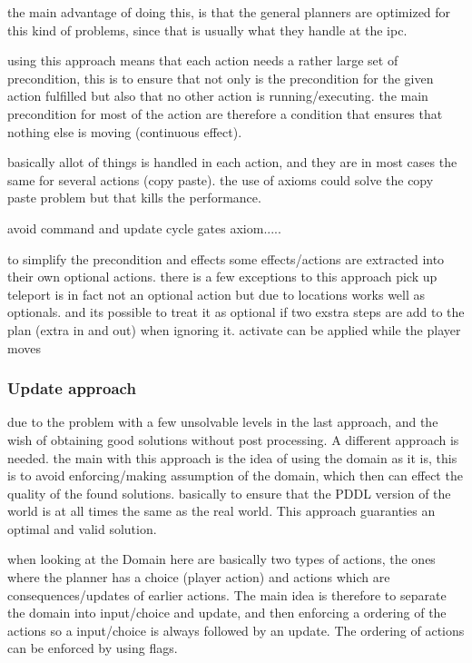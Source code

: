 		
		
		

		
		the main advantage of doing this, is that the general planners are optimized for this kind of problems, since that is usually what they handle at the ipc.
		
		
		
		using this approach means that each action needs a rather large set of precondition, this is to ensure that not only is the precondition for the given action fulfilled but also that no other action is running/executing. the main precondition for most of the action are therefore a condition that ensures that nothing else is moving (continuous effect).
		
		basically allot of things is handled in each action, and they are in most cases the same for several actions (copy paste). the use of axioms could solve the copy paste problem but that kills the performance.
		
		avoid command and update cycle
			gates axiom.....
		
		to simplify the precondition and effects some effects/actions are extracted into their own optional actions.
		there is a few exceptions to this approach
			pick up
			teleport
				is in fact not an optional action but due to locations works well as optionals. and its possible to treat it as optional if two exstra steps are add to the plan (extra in and out) when ignoring it. 
			activate
				can be applied while the player moves
		
		\subsubsection{Update approach}
		due to the problem with a few unsolvable levels in the last approach, and the wish of obtaining good solutions without post processing. A different approach is needed.
		the main with this approach is the idea of using the domain as it is, this is to avoid enforcing/making assumption of the domain, which then can effect the quality of the found solutions. basically to ensure that the PDDL version of the world is at all times the same as the real world. This approach guaranties an optimal and valid solution.
		
		when looking at the Domain here are basically two types of actions, the ones where the planner has a choice (player action) and actions which are consequences/updates of earlier actions. The main idea is therefore to separate the domain into input/choice and update, and then enforcing a ordering of the actions so a input/choice is always followed by an update. The ordering of actions can be enforced by using flags.	
		
